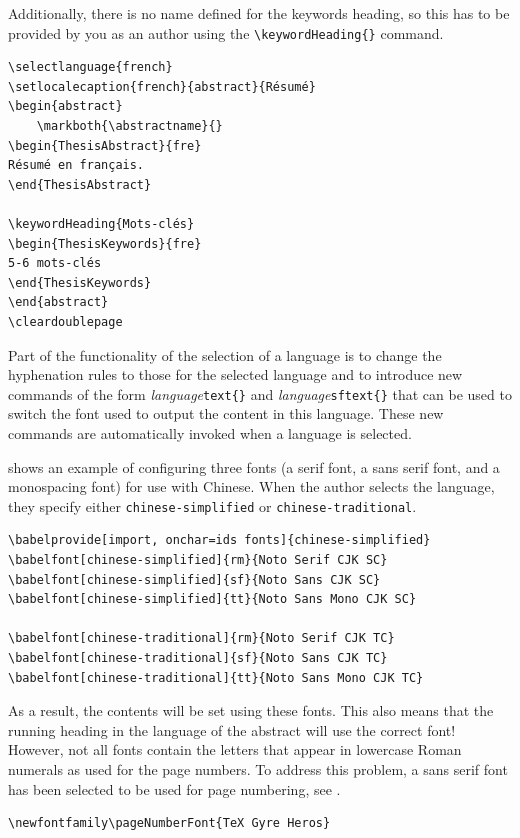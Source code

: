 \documentclass[12pt, twoside]{article}
\begin{document}
Additionally, there is no name defined for the keywords heading, so this has to be provided by you as an author using the \texttt{\textbackslash keywordHeading\{\}} command.
\begin{lstlisting}[style=latexExampleForAuthors,  escapechar=|, caption={Structure of abstract\_french.tex}, label=lst:FrenchAbstract]
\selectlanguage{french}
\setlocalecaption{french}{abstract}{Résumé}
\begin{abstract}
    \markboth{\abstractname}{}
\begin{ThesisAbstract}{fre}
Résumé en français.
\end{ThesisAbstract}

\keywordHeading{Mots-clés}
\begin{ThesisKeywords}{fre}
5-6 mots-clés
\end{ThesisKeywords}
\end{abstract}
\cleardoublepage
\end{lstlisting}

Part of the functionality of the selection of a language is to change the hyphenation rules to those for the selected language and to introduce new commands of the form \hbox{\textit{language}\texttt{text\{\}}} and \hbox{\textit{language}\texttt{sftext\{\}}} that can be used to switch the font used to output the content in this language. These new commands are automatically invoked when a language is selected.

 shows an example of configuring three fonts (a serif font, a sans serif font, and a monospacing font) for use with Chinese. When the author selects the language, they specify either \texttt{chinese-simplified} or \texttt{chinese-traditional}.
\begin{lstlisting}[style=latexExampleForAuthors,  escapechar=|, caption={Font configuration for Chinese}, label=lst:FontConfigurationForChinese]
\babelprovide[import, onchar=ids fonts]{chinese-simplified}
\babelfont[chinese-simplified]{rm}{Noto Serif CJK SC}
\babelfont[chinese-simplified]{sf}{Noto Sans CJK SC}
\babelfont[chinese-simplified]{tt}{Noto Sans Mono CJK SC}
    
\babelfont[chinese-traditional]{rm}{Noto Serif CJK TC}
\babelfont[chinese-traditional]{sf}{Noto Sans CJK TC}
\babelfont[chinese-traditional]{tt}{Noto Sans Mono CJK TC}
\end{lstlisting}

As a result, the contents will be set using these fonts. This also means that the running heading in the language of the abstract will use the correct font! However, not all fonts contain the letters that appear in lowercase Roman numerals as used for the page numbers.
To address this problem, a sans serif font has been selected to be used for page numbering, see .
\begin{lstlisting}[style=latexExampleForAuthors,  escapechar=|, caption={Font configuration for page numbering}, label=lst:pageNumeringFont]
\newfontfamily\pageNumberFont{TeX Gyre Heros}
\end{lstlisting}
\end{document}
